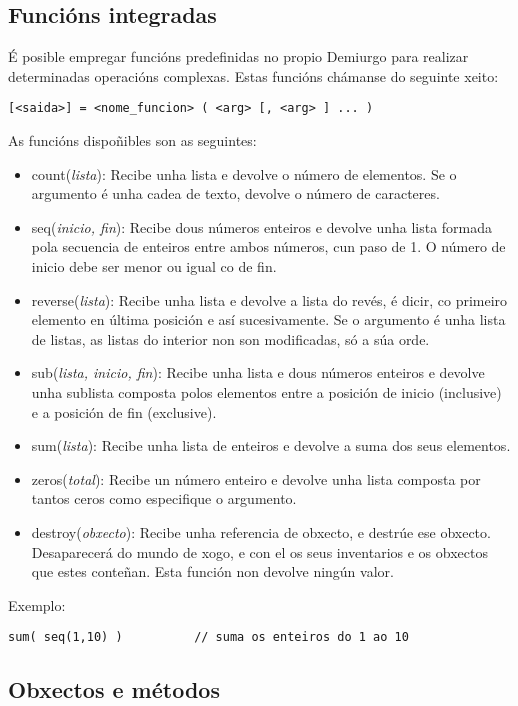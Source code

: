 \subsection{Funcións integradas}
É posible empregar funcións predefinidas no propio Demiurgo para realizar
determinadas operacións complexas. Estas funcións chámanse do seguinte xeito:
\begin{lstlisting}
[<saida>] = <nome_funcion> ( <arg> [, <arg> ] ... )
\end{lstlisting}
\par As funcións dispoñibles son as seguintes:
\begin{itemize}
  \item count({\it lista}): Recibe unha lista e devolve o número de elementos.
  Se o argumento é unha cadea de texto, devolve o número de caracteres.
  \item seq({\it inicio, fin}): Recibe dous números enteiros e devolve unha
  lista formada pola secuencia de enteiros entre ambos números, cun paso de 1. O
  número de inicio debe ser menor ou igual co de fin.
  \item reverse({\it lista}): Recibe unha lista e devolve a lista do revés, é
  dicir, co primeiro elemento en última posición e así sucesivamente. Se o
  argumento é unha lista de listas, as listas do interior non son modificadas,
  só a súa orde.
  \item sub({\it lista, inicio, fin}): Recibe unha lista e dous números
  enteiros e devolve unha sublista composta polos elementos entre a posición de inicio
  (inclusive) e a posición de fin (exclusive).
  \item sum({\it lista}): Recibe unha lista de enteiros e devolve a suma dos
  seus elementos.
  \item zeros({\it total}): Recibe un número enteiro e devolve unha lista
  composta por tantos ceros como especifique o argumento.
  \item destroy({\it obxecto}): Recibe unha referencia de obxecto, e destrúe ese
  obxecto. Desaparecerá do mundo de xogo, e con el os seus inventarios e os
  obxectos que estes conteñan. Esta función non devolve ningún valor.
\end{itemize}
\par Exemplo:
\begin{lstlisting}
sum( seq(1,10) )          // suma os enteiros do 1 ao 10
\end{lstlisting}

\subsection{Obxectos e métodos}
